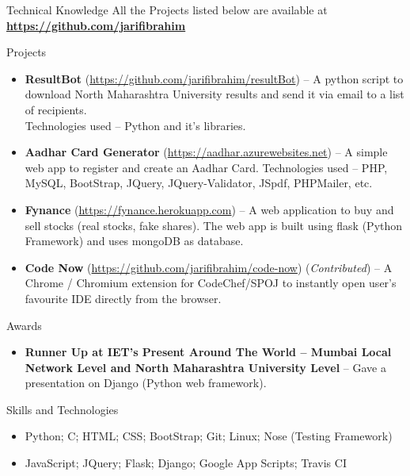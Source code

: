 \documentclass[]{mcdowellcv}
\begin{document}
	\begin{cvsection}{Technical Knowledge}{}{}
	All the Projects listed below are available at \textbf{\url{https://github.com/jarifibrahim}}   \\                                                         	\begin{cvsubsection}{Projects}{}{}
			\begin{itemize}
				\item \textbf{ResultBot}
				    (\url{https://github.com/jarifibrahim/resultBot}) -- A python script to download North Maharashtra University results and send it via email to a list of recipients. \\ Technologies used -- Python and it's libraries.
				\item \textbf{Aadhar Card Generator}
				    (\url{https://aadhar.azurewebsites.net})
					-- A simple web app to register and create an Aadhar Card. Technologies used -- PHP, MySQL, BootStrap, JQuery, JQuery-Validator, JSpdf, PHPMailer, etc.
			    \item \textbf{Fynance}
			        (\url{https://fynance.herokuapp.com})
			        -- A web application to buy and sell stocks (real stocks, fake shares). The web app is built using flask (Python Framework) and uses mongoDB as database.
			    \item \textbf{Code Now}
			        (\url{https://github.com/jarifibrahim/code-now}) (\textit{Contributed})
			        -- A Chrome / Chromium extension for CodeChef/SPOJ to instantly open user's favourite IDE directly from the browser.
			\end{itemize}
		\end{cvsubsection}
	\end{cvsection}
	
	\begin{cvsection}{Awards}
		\begin{cvsubsection}{}{}{}	
			\begin{itemize}
				\item \textbf{Runner Up at IET's Present Around The World -- Mumbai Local Network Level and North Maharashtra University Level} -- Gave a presentation on Django (Python web framework).
			\end{itemize}
		\end{cvsubsection}
	\end{cvsection}
	
	\begin{cvsection}{Skills and Technologies}
		\begin{cvsubsection}{}{}{}	
			\begin{itemize}
				\item Python; C; HTML; CSS; BootStrap; Git; Linux; Nose (Testing Framework)
				\item  JavaScript; JQuery; Flask; Django; Google App Scripts; Travis CI
			\end{itemize}
		\end{cvsubsection}
	\end{cvsection}
	
\end{document}
